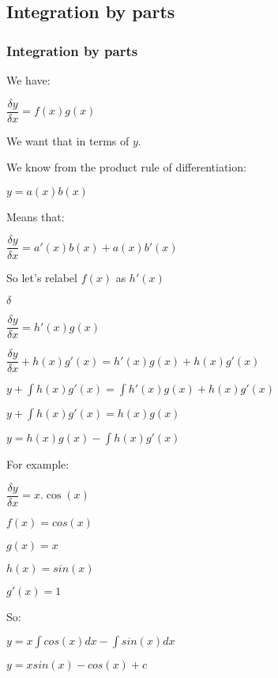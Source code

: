 
\subsection{Integration by parts}

\subsubsection{Integration by parts}

We have:

\(\dfrac{\delta y}{\delta x}=f(x)g(x)\)

We want that in terms of \(y\).

We know from the product rule of differentiation:

\(y=a(x)b(x)\)

Means that:

\(\dfrac{\delta y}{\delta x}=a'(x)b(x)+a(x)b'(x)\)

So let's relabel \(f(x)\) as \(h'(x)\)

\(\delta\)

\(\dfrac{\delta y}{\delta x}=h'(x)g(x)\)

\(\dfrac{\delta y}{\delta x}+h(x)g'(x)=h'(x)g(x)+h(x)g'(x)\)

\(y+\int h(x)g'(x)=\int h'(x)g(x)+h(x)g'(x)\)

\(y+\int h(x)g'(x)=h(x)g(x)\)

\(y=h(x)g(x)-\int h(x)g'(x)\)

For example:

\(\dfrac{\delta y}{\delta x}=x.\cos(x)\)

\(f(x)=cos(x)\)

\(g(x)=x\)

\(h(x)=sin(x)\)

\(g'(x)=1\)

So:

\(y=x\int cos(x) dx-\int sin(x)dx\)

\(y=xsin(x)-cos(x)+c\)

